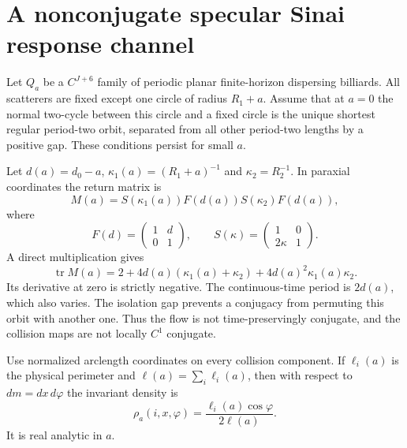 \documentclass[11pt,reqno]{amsart}
\theoremstyle{definition}
\theoremstyle{remark}
\begin{document}
\section{A nonconjugate specular Sinai response channel}\label{sec:specular}

Let $Q_a$ be a $C^{J+6}$ family of periodic planar finite-horizon dispersing
billiards.  All scatterers are fixed except one circle of radius $R_1+a$.
Assume that at $a=0$ the normal two-cycle between this circle and a fixed
circle is the unique shortest regular period-two orbit, separated from all
other period-two lengths by a positive gap.  These conditions persist for
small $a$.

Let $d(a)=d_0-a$, $\kappa_1(a)=(R_1+a)^{-1}$ and
$\kappa_2=R_2^{-1}$.  In paraxial coordinates the return matrix is
\[
 M(a)=S(\kappa_1(a))F(d(a))S(\kappa_2)F(d(a)),
\]
where
\[
 F(d)=\begin{pmatrix}1&d\\0&1\end{pmatrix},
 \qquad
 S(\kappa)=\begin{pmatrix}1&0\\2\kappa&1\end{pmatrix}.
\]
A direct multiplication gives
\begin{equation}\label{eq:trace}
 \operatorname{tr}M(a)=2+4d(a)(\kappa_1(a)+\kappa_2)
 +4d(a)^2\kappa_1(a)\kappa_2.
\end{equation}
Its derivative at zero is strictly negative.  The continuous-time period is
$2d(a)$, which also varies.  The isolation gap prevents a conjugacy from
permuting this orbit with another one.  Thus the flow is not time-preservingly
conjugate, and the collision maps are not locally $C^1$ conjugate.

Use normalized arclength coordinates on every collision component.  If
$\ell_i(a)$ is the physical perimeter and $\ell(a)=\sum_i\ell_i(a)$, then with
respect to $dm=dx\,d\varphi$ the invariant density is
\begin{equation}\label{eq:sinai-density}
 \rho_a(i,x,\varphi)=
 \frac{\ell_i(a)\cos\varphi}{2\ell(a)}.
\end{equation}
It is real analytic in $a$.
\end{document}
